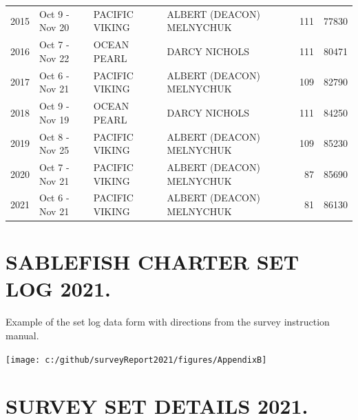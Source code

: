 \documentclass[12pt]{article}\usepackage[]{graphicx}\usepackage[]{color}
\begin{document}
\begin{appendices}
\begin{longtable}{rlllrr}
2015 & Oct  9  - Nov 20 & PACIFIC VIKING & ALBERT (DEACON) MELNYCHUK & 111 & 77830\\
2016 & Oct  7  - Nov 22 & OCEAN PEARL & DARCY NICHOLS & 111 & 80471\\
2017 & Oct  6  - Nov 21 & PACIFIC VIKING & ALBERT (DEACON) MELNYCHUK & 109 & 82790\\
2018 & Oct  9  - Nov 19 & OCEAN PEARL & DARCY NICHOLS & 111 & 84250\\
2019 & Oct  8  - Nov 25 & PACIFIC VIKING & ALBERT (DEACON) MELNYCHUK & 109 & 85230\\
2020 & Oct  7  - Nov 21 & PACIFIC VIKING & ALBERT (DEACON) MELNYCHUK & 87 & 85690\\
2021 & Oct  6  - Nov 21 & PACIFIC VIKING & ALBERT (DEACON) MELNYCHUK & 81 & 86130\\
\bottomrule
\end{longtable}
\endgroup{}
\clearpage

\section{SABLEFISH CHARTER SET LOG 2021.}
\label{app:second-appendix}

Example of the set log data form with directions from the survey instruction manual.
\begin{flushleft}\texttt{[image: c:/github/surveyReport2021/figures/AppendixB]} \end{flushleft}
\clearpage

\section{SURVEY SET DETAILS 2021.}
\label{app:third-appendix}


\end{appendices}
\end{document}
